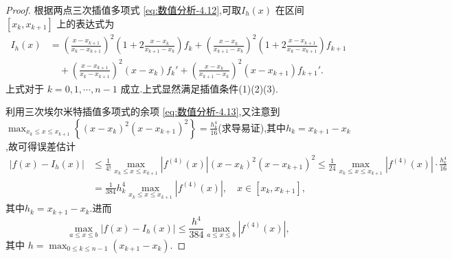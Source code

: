 \documentclass[../../main.tex]{subfiles}
\begin{document}
\begin{proof}
根据两点三次插值多项式 \eqref{eq:数值分析-4.12},可取$I_h(x)$ 在区间 $[x_k, x_{k + 1}]$ 上的表达式为
\begin{align*}
I_h(x) &= \left( \frac{x - x_{k + 1}}{x_k - x_{k + 1}} \right)^2 \left( 1 + 2 \frac{x - x_k}{x_{k + 1} - x_k} \right) f_k + \left( \frac{x - x_k}{x_{k + 1} - x_k} \right)^2 \left( 1 + 2 \frac{x - x_{k + 1}}{x_k - x_{k + 1}} \right) f_{k + 1} \\
&\quad + \left( \frac{x - x_{k + 1}}{x_k - x_{k + 1}} \right)^2 (x - x_k) f_k' + \left( \frac{x - x_k}{x_{k + 1} - x_k} \right)^2 (x - x_{k + 1}) f_{k + 1}'.
\end{align*}
上式对于 $k = 0, 1, \cdots, n - 1$ 成立.上式显然满足插值条件(1)(2)(3).

利用三次埃尔米特插值多项式的余项 \eqref{eq:数值分析-4.13},又注意到$\max_{x_k\leqslant x\leqslant x_{k+1}} \left\{ (x-x_k)^2(x-x_{k+1})^2 \right\} =\frac{h_{k}^{4}}{16}$(求导易证),其中$h_k = x_{k + 1} - x_k$,故可得误差估计
\begin{align*}
|f(x)-I_h(x)|&\leqslant \frac{1}{4!}\max_{x_k\leqslant x\leqslant x_{k+1}} |f^{(4)}(x)|(x-x_k)^2(x-x_{k+1})^2\leqslant \frac{1}{24}\max_{x_k\leqslant x\leqslant x_{k+1}} |f^{(4)}(x)|\cdot \frac{h_{k}^{4}}{16}
\\
&=\frac{1}{384}h_{k}^{4}\max_{x_k\leqslant x\leqslant x_{k+1}} |f^{(4)}(x)|,\quad x\in [x_k,x_{k+1}],
\end{align*}
其中$h_k = x_{k + 1} - x_k$.进而
\[
\max_{a \leqslant x \leqslant b} | f(x) - I_h(x) | \leqslant \frac{h^4}{384} \max_{a \leqslant x \leqslant b} | f^{(4)}(x) |,
\]
其中 $h = \max_{0 \leqslant k \leqslant n - 1} (x_{k + 1} - x_k)$.
\end{proof}
\end{document}
